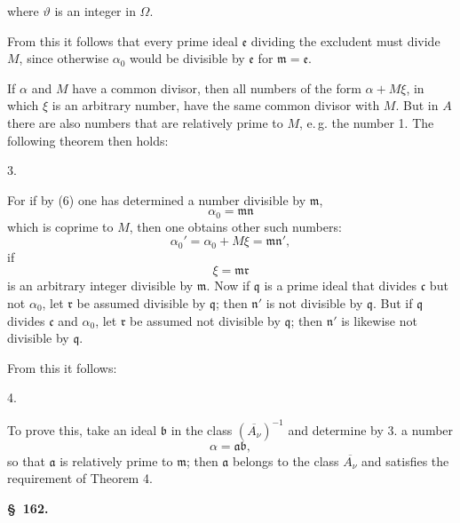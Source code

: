 where $\vartheta$ is an integer in $\Omega$.

From this it follows that every prime ideal $\mathfrak{e}$ dividing the
excludent must divide $M$, since otherwise $\alpha_0$ would be divisible
by $\mathfrak{e}$ for $\mathfrak{m} = \mathfrak{e}$.

If $\alpha$ and $M$ have a common divisor, then all numbers of the form
$\alpha + M\xi$, in which $\xi$ is an arbitrary number, have the same
common divisor with $M$. But in $A$ there are also numbers that are
relatively prime to $M$, e.\,g. the number 1. The following theorem
then holds:

3. 

For if by (6) one has determined a number divisible by $\mathfrak{m}$,
\[
\alpha_0 = \mathfrak{m}\mathfrak{n}
\]
which is coprime to $M$, then one obtains other such numbers:
\[
\alpha_0' = \alpha_0 + M\xi = \mathfrak{m}\mathfrak{n}',
\]
if
\[
\xi = \mathfrak{m}\mathfrak{r}
\]
is an arbitrary integer divisible by $\mathfrak{m}$. Now if $\mathfrak{q}$ is a prime ideal that divides $\mathfrak{c}$
but not $\alpha_0$, let $\mathfrak{r}$ be assumed divisible by
$\mathfrak{q}$; then $\mathfrak{n}'$ is not divisible by $\mathfrak{q}$. But if $\mathfrak{q}$ divides $\mathfrak{c}$
and $\alpha_0$, let $\mathfrak{r}$ be assumed not divisible by $\mathfrak{q}$; then
$\mathfrak{n}'$ is likewise not divisible by $\mathfrak{q}$.

From this it follows:

4. 

To prove this, take an ideal $\mathfrak{b}$ in the class
$(\overline{A_\nu})^{-1}$ and determine by 3. a number
\[
\alpha = \mathfrak{a}\mathfrak{b},
\]
so that $\mathfrak{a}$ is relatively prime to $\mathfrak{m}$; then $\mathfrak{a}$ belongs to the class $\overline{A_\nu}$
and satisfies the requirement of Theorem 4.

\noindent\textbf{\S\ 162.\qquad {}}

